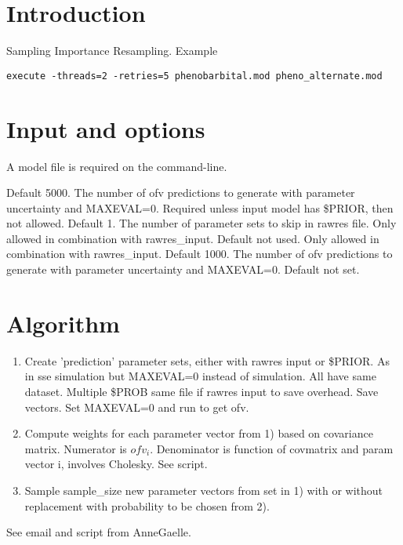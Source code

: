 



\maketitle


\section{Introduction}
Sampling Importance Resampling.
Example
\begin{verbatim}
execute -threads=2 -retries=5 phenobarbital.mod pheno_alternate.mod
\end{verbatim}

\section{Input and options}
A model file is required on the command-line.

\begin{optionlist}
Default 5000. The number of ofv predictions to generate with parameter uncertainty and MAXEVAL=0.
\nextopt
{}
Required unless input model has \$PRIOR, then not allowed.
\nextopt
{}
Default 1. The number of parameter sets to skip in rawres file. Only allowed in combination with rawres\_input.
\nextopt
{}
Default not used. Only allowed in combination with rawres\_input.
\nextopt
{}
Default 1000. The number of ofv predictions to generate with parameter uncertainty and MAXEVAL=0.
\nextopt
{}
Default not set. 
\nextopt
\end{optionlist}


\section{Algorithm}
\begin{enumerate}
\item Create 'prediction' parameter sets, either with rawres input or \$PRIOR. As in sse simulation but MAXEVAL=0 instead of simulation. 
All have same dataset. Multiple \$PROB same file if rawres input to save overhead.
Save vectors. Set MAXEVAL=0 and run to get ofv.
\item Compute weights for each parameter vector from 1) based on covariance matrix. Numerator is $ofv_i$. Denominator is function of
covmatrix and param vector i, involves Cholesky. See script.
\item Sample sample\_size new parameter vectors from set in 1) with or without replacement with probability to be chosen from 2).
\end{enumerate}

See email and script from AnneGaelle.



